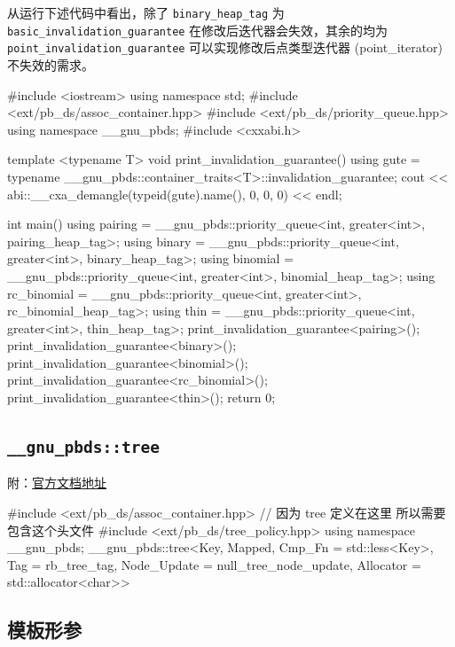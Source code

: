从运行下述代码中看出，除了 \texttt{binary\_heap\_tag} 为 \texttt{basic\_invalidation\_guarantee} 在修改后迭代器会失效，其余的均为 \texttt{point\_invalidation\_guarantee} 可以实现修改后点类型迭代器 (point\_iterator) 不失效的需求。


\begin{codeline}
#include <iostream>
using namespace std;
#include <ext/pb_ds/assoc_container.hpp>
#include <ext/pb_ds/priority_queue.hpp>
using namespace __gnu_pbds;
#include <cxxabi.h>

template <typename T>
void print_invalidation_guarantee() {
  using gute = typename __gnu_pbds::container_traits<T>::invalidation_guarantee;
  cout << abi::__cxa_demangle(typeid(gute).name(), 0, 0, 0) << endl;
}

int main() {
  using pairing =
      __gnu_pbds::priority_queue<int, greater<int>, pairing_heap_tag>;
  using binary = __gnu_pbds::priority_queue<int, greater<int>, binary_heap_tag>;
  using binomial =
      __gnu_pbds::priority_queue<int, greater<int>, binomial_heap_tag>;
  using rc_binomial =
      __gnu_pbds::priority_queue<int, greater<int>, rc_binomial_heap_tag>;
  using thin = __gnu_pbds::priority_queue<int, greater<int>, thin_heap_tag>;
  print_invalidation_guarantee<pairing>();
  print_invalidation_guarantee<binary>();
  print_invalidation_guarantee<binomial>();
  print_invalidation_guarantee<rc_binomial>();
  print_invalidation_guarantee<thin>();
  return 0;
}
\end{codeline}


\subsection{\texorpdfstring{\texttt{\_\_gnu\_pbds::tree}}{\_\_gnu\_pbds::tree}}\label{gnu_pbdstree}

附：\href{https://gcc.gnu.org/onlinedocs/libstdc++/ext/pb_ds/tree_based_containers.html}{官方文档地址}


\begin{codeline}
#include <ext/pb_ds/assoc_container.hpp>  // 因为 tree 定义在这里 所以需要包含这个头文件
#include <ext/pb_ds/tree_policy.hpp>
using namespace __gnu_pbds;
__gnu_pbds::tree<Key, Mapped, Cmp_Fn = std::less<Key>, Tag = rb_tree_tag,
                 Node_Update = null_tree_node_update,
                 Allocator = std::allocator<char>>
\end{codeline}


\subsection{模板形参}\label{ux6a21ux677fux5f62ux53c2-1}

